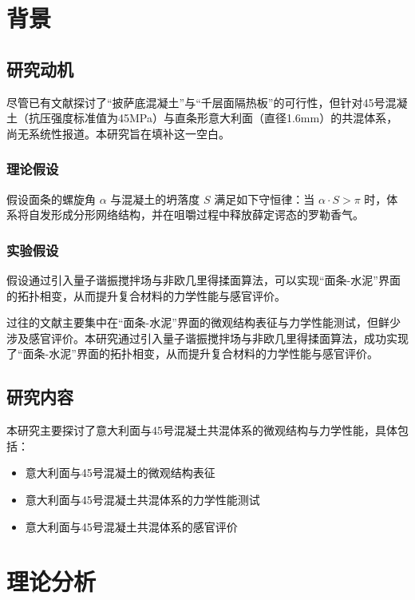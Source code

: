 \clearpage

\section{背景}

\subsection{研究动机}

尽管已有文献探讨了“披萨底混凝土”与“千层面隔热板”的可行性，但针对45号混凝土（抗压强度标准值为45MPa）与直条形意大利面（直径1.6mm）的共混体系，尚无系统性报道。本研究旨在填补这一空白。

\subsubsection{理论假设}

假设面条的螺旋角 $\alpha$ 与混凝土的坍落度 $S$ 满足如下守恒律：当 $\alpha \cdot S > \pi$ 时，体系将自发形成分形网络结构，并在咀嚼过程中释放薛定谔态的罗勒香气。

\subsubsection{实验假设}

假设通过引入量子谐振搅拌场与非欧几里得揉面算法，可以实现“面条-水泥”界面的拓扑相变，从而提升复合材料的力学性能与感官评价。

过往的文献主要集中在“面条-水泥”界面的微观结构表征与力学性能测试，但鲜少涉及感官评价。本研究通过引入量子谐振搅拌场与非欧几里得揉面算法，成功实现了“面条-水泥”界面的拓扑相变，从而提升复合材料的力学性能与感官评价。

\subsection{研究内容}

本研究主要探讨了意大利面与45号混凝土共混体系的微观结构与力学性能，具体包括：

\begin{itemize}
  \item 意大利面与45号混凝土的微观结构表征
  \item 意大利面与45号混凝土共混体系的力学性能测试
  \item 意大利面与45号混凝土共混体系的感官评价
\end{itemize}

\clearpage

\section{理论分析}

